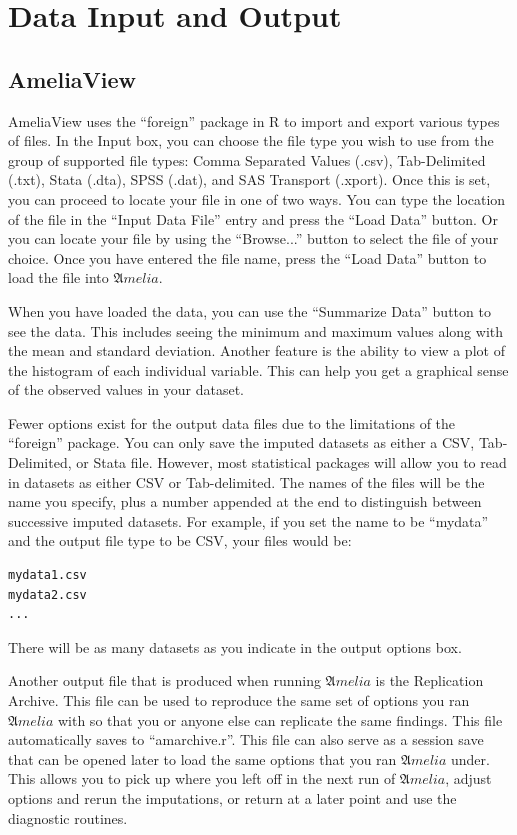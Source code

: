 \documentclass[12pt,titlepage]{article}
\begin{document}
\section{Data Input and Output}
\label{sec:data}


\subsection{AmeliaView}
\label{sec:data-gui}
AmeliaView uses the ``foreign'' package in R to import and export
various types of files.  In the Input box, you can choose the file
type you wish to use from the group of supported file types: Comma
Separated Values (.csv), Tab-Delimited (.txt), Stata (.dta), SPSS
(.dat), and SAS Transport (.xport). Once this is set, you can proceed
to locate your file in one of two ways.  You can type the location of
the file in the ``Input Data File'' entry and press the ``Load Data''
button.  Or you can locate your file by using the ``Browse...'' button
to select the file of your choice.  Once you have entered the file
name, press the ``Load Data'' button to load the file into ${\mathfrak
  Amelia}$.

When you have loaded the data, you can use the ``Summarize Data''
button to see the data.  This includes seeing the minimum and maximum
values along with the mean and standard deviation.  Another feature is
the ability to view a plot of the histogram of each individual
variable.  This can help you get a graphical sense of the observed
values in your dataset.

Fewer options exist for the output data files due to the limitations
of the ``foreign'' package.  You can only save the imputed datasets as
either a CSV, Tab-Delimited, or Stata file. However, most statistical
packages will allow you to read in datasets as either CSV or
Tab-delimited.  The names of the files will be the name you specify,
plus a number appended at the end to distinguish between successive
imputed datasets.  For example, if you set the name to be ``mydata''
and the output file type to be CSV, your files would be:
\begin{verbatim}
mydata1.csv
mydata2.csv
...
\end{verbatim}
There will be as many datasets as you indicate in the output options
box.

Another output file that is produced when running ${\mathfrak Amelia}$
is the Replication Archive.  This file can be used to reproduce the
same set of options you ran ${\mathfrak Amelia}$ with so that you or
anyone else can replicate the same findings.  This file automatically
saves to ``amarchive.r''. This file can also serve as a session save
that can be opened later to load the same options that you ran
${\mathfrak Amelia}$ under.  This allows you to pick up where you left
off in the next run of ${\mathfrak Amelia}$, adjust options and rerun
the imputations, or return at a later point and use the diagnostic
routines.
\end{document}
